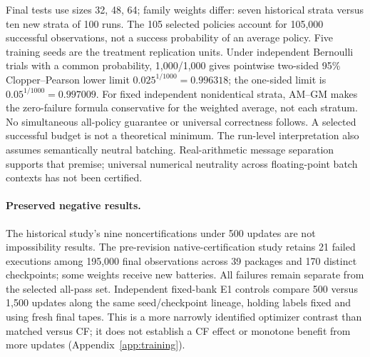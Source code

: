\documentclass[10pt]{article}
\begin{document}
Final tests use sizes 32, 48, 64; family weights differ: seven historical
strata versus ten new strata of 100 runs. The 105 selected policies account
for 105,000 successful observations, not a success probability of an average
policy. Five training seeds are the treatment replication units.
Under independent Bernoulli trials with a common probability, 1,000/1,000
gives pointwise two-sided 95\% Clopper--Pearson lower limit
$0.025^{1/1000}=0.996318$; the one-sided limit is
$0.05^{1/1000}=0.997009$. For fixed independent nonidentical strata, AM--GM
makes the zero-failure formula conservative for the weighted average, not
each stratum. No simultaneous all-policy guarantee or universal correctness
follows. A selected successful budget is not a theoretical minimum.
The run-level interpretation also assumes semantically neutral batching.
Real-arithmetic message separation supports that premise; universal numerical
neutrality across floating-point batch contexts has not been certified.

\paragraph{Preserved negative results.}
The historical study's nine noncertifications under 500 updates are not
impossibility results. The pre-revision native-certification study retains
21 failed executions among
195,000 final observations across 39 packages and 170 distinct checkpoints;
some weights receive new batteries. All failures remain separate from the
selected all-pass set. Independent fixed-bank E1 controls compare 500 versus
1,500 updates along the same seed/checkpoint lineage, holding labels fixed
and using fresh final tapes. This is a more narrowly identified optimizer
contrast than matched versus CF; it does not establish a CF effect or
monotone benefit from more updates (Appendix~\ref{app:training}).
\end{document}
